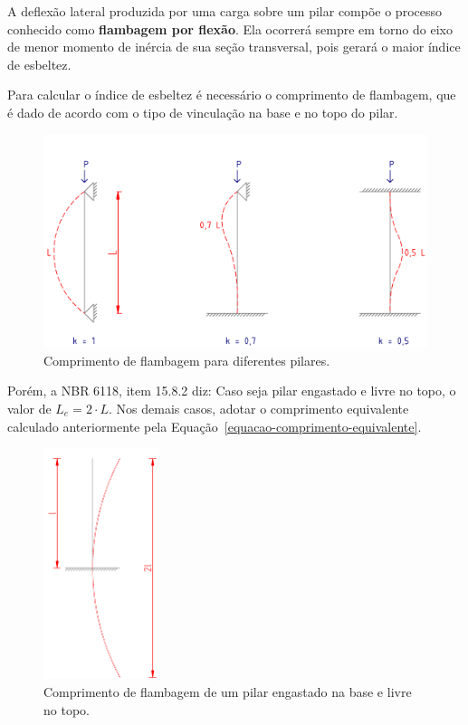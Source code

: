 A deflexão lateral produzida por uma carga sobre um pilar compõe o processo conhecido como \textbf{flambagem por flexão}. Ela ocorrerá sempre em torno do eixo de menor momento de inércia de sua seção transversal, pois gerará o maior índice de esbeltez.

Para calcular o índice de esbeltez é necessário o comprimento de flambagem, que é dado de acordo com o tipo de vinculação na base e no topo do pilar.

\begin{figure}[H]
	\begin{center}
	\caption{Comprimento de flambagem para diferentes pilares.}
    	\includegraphics[width=\textwidth]{Comprimento-de-flambagem/Imagens/Comprimento-de-flambagem-0.png}
	\end{center}
\end{figure}

Porém, a NBR 6118, item 15.8.2 diz: Caso seja pilar engastado e livre no topo, o valor de $L_e=2\cdot L$. Nos demais casos, adotar o comprimento equivalente calculado anteriormente pela Equação~\eqref{equacao-comprimento-equivalente}.

\begin{figure}[H]
	\begin{center}
	\caption{Comprimento de flambagem de um pilar engastado na base e livre no topo.}
    	\includegraphics[width=0.3\textwidth]{Comprimento-de-flambagem/Imagens/Comprimento-de-flambagem-1.png}
	\end{center}
\end{figure}